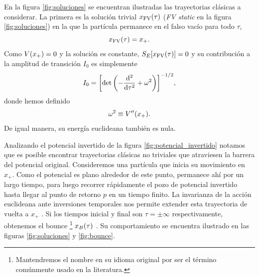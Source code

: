 En la figura \ref{fig:soluciones} se encuentran ilustradas las trayectorias clásicas a considerar. La primera es la solución trivial $x_{\text{FV}}\qty(\tau)$ (\emph{FV static} en la figura \ref{fig:soluciones}) en la que la partícula permanece en el falso vacío para todo $\tau$,
\begin{equation}
x_{\text{FV}}\qty(\tau) = x_+.
\end{equation} 
Como $V\qty(x_+) = 0$ y la solución es constante, $S_E[x_{\text{FV}}\qty(\tau)] = 0$ 
y su contribución a la amplitud de transición $I_0$ es simplemente %
\begin{equation}
	I_0 = \qty[ \det\left(-\dv[2]{\tau} + \omega^2 \right) ]^{-1/2},
\end{equation}
donde hemos definido %
\begin{equation}
	\omega^2 \equiv V''\qty(x_+).
\end{equation}
De igual manera, %
su energía euclideana también es nula. %


Analizando el potencial invertido de la figura \ref{fig:potencial_invertido} notamos que es posible encontrar trayectorias clásicas no triviales que atraviesen la barrera del potencial original. Consideremos una partícula que inicia su movimiento en $x_+$. Como el potencial es plano alrededor de este punto, permanece ahí por un largo tiempo, para luego recorrer rápidamente el pozo de potencial invertido hasta llegar al punto de retorno $p$ en un tiempo finito. %
La invarianza de la acción euclideana ante inversiones temporales  nos permite extender esta trayectoria de vuelta a $x_+$ \cite{weinberg2012classical}. Si los tiempos inicial y final son $\tau = \pm \infty$ respectivamente, obtenemos el bounce \footnote{Mantendremos el nombre en su idioma original por ser el término comúnmente usado en la literatura.}  $x_B\qty(\tau)$ \cite{coleman1977fate}. Su comportamiento se encuentra ilustrado en las figuras \ref{fig:soluciones} y \ref{fig:bounce}. 

